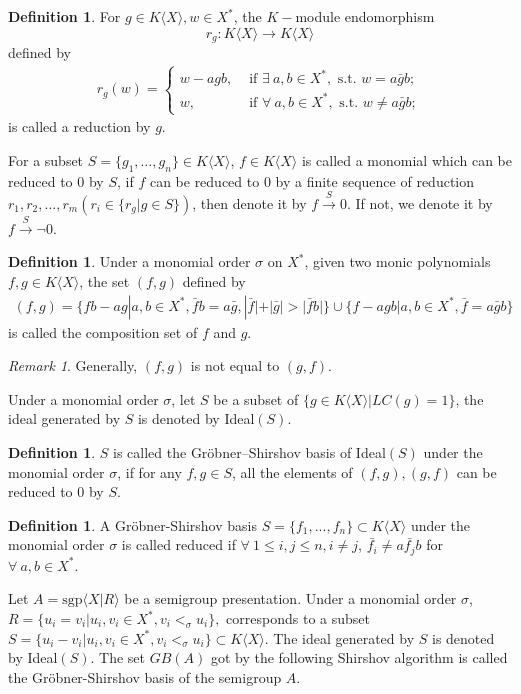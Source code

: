\documentclass[UTF8]{amsart}
\theoremstyle{definition}
\newtheorem{definition}[tpcl]{Definition}
\theoremstyle{remark}
\newtheorem{remark}[tpcl]{Remark}
\numberwithin{equation}{section}
\begin{document}
\begin{definition}
For $g\in K\langle X \rangle,w\in X^*$, the $K-$module endomorphism $$r_g:K\langle X\rangle \rightarrow K\langle X\rangle $$ defined by
\begin{align*}
r_g(w)=
\begin{cases}
w-agb, &\mbox{ if }\exists~a,b\in X^*,\mbox{ s.t. }w=a\bar{g}b;\\
w,   &\mbox{ if }\forall~a,b\in X^*,\mbox{ s.t. }w\ne a\bar{g}b;
\end{cases}
\end{align*}
 is called a reduction by $g$.
\end{definition}
For a subset $S=\{g_1,\ldots,g_n\}\in K\langle X\rangle$, $f\in K\langle X\rangle$ is called a monomial which can be reduced to $0$ by $S$, if $f$ can be reduced to $0$ by a finite sequence of reduction $r_1,r_2,...,r_m(r_i\in \{r_g|g\in S\})$, then denote it by $f\xrightarrow{S}0$. If not, we denote it by $f \xrightarrow{S} \neg0$.
\begin{definition}
Under a monomial order  $\sigma$ on $X^*$, given two monic polynomials $f,g\in K\langle X \rangle $, the set $(f,g)$ defined by
\begin{align*}
(f,g)=\{fb-ag|a,b\in X^*,\bar{f}b=a\bar{g},|\bar{f}|+|\bar{g}|>|\bar{f}b|\}\cup \{f-agb|a,b\in X^*,\bar{f}=a\bar{g}b\}
\end{align*}
is called the composition set of $f$ and $g$.
\end{definition}
\begin{remark}
Generally, $(f,g)$ is not equal to $(g,f)$.
\end{remark}
Under  a monomial order $\sigma$,  let $S$ be a subset of $\{g\in K\langle X\rangle |LC(g)=1\}$, the ideal generated by $S$ is denoted by Ideal$(S)$.
\begin{definition}
$S$ is called the Gr\"{o}bner--Shirshov basis of Ideal$(S)$ under the monomial order $\sigma$, if for any $f,g\in S$, all the elements of $(f,g),(g,f)$ can  be reduced to $0$ by $S$.
\end{definition}
\begin{definition}
A Gr\"{o}bner-Shirshov basis $S=\{f_1,...,f_n\}\subset K\langle X\rangle$ under the monomial order $\sigma$ is called reduced if $\forall ~1\leq i,j\leq n,i\ne j$, $\bar{f_i}\ne a\bar{f_j}b$ for $\forall ~a,b\in X^*$.
\end{definition}
Let  $A=\mbox{sgp}\langle X|R \rangle $ be a semigroup presentation. Under a monomial order $\sigma$,
$
R=\{u_i=v_i|u_i,v_i\in X^*,v_i<_{\sigma}u_i\},
$
corresponds to a  subset
$
S=\{u_i-v_i|u_i,v_i\in X^*,v_i<_{\sigma}u_i\}\subset K\langle X\rangle.
$
The ideal generated by $S$ is denoted by Ideal$(S)$. The set $GB(A)$ got by the following Shirshov algorithm is called the Gr\"{o}bner-Shirshov basis of the semigroup $A$. \\
\end{document}
